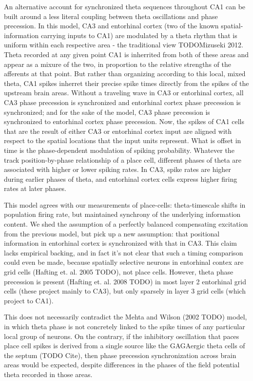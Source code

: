 \documentclass[10pt]{article}
\begin{document}
An alternative account for synchronized theta sequences throughout CA1 can be built around a less literal coupling between theta oscillations and phase precession. In this model, CA3 and entorhinal cortex (two of the known spatial-information carrying inputs to CA1) are modulated by a theta rhythm that is uniform within each respective area - the traditional view TODO{Mizuseki 2012}. Theta recorded at any given point CA1 is inherrited from both of these areas and appear as a mixure of the two, in proportion to the relative strengths of the afferents at that point. But rather than organizing according to this local, mixed theta, CA1 spikes inherret their precise spike times directly from the spikes of the upstream brain areas. Without a traveling wave in CA3 or entorhinal cortex, all CA3 phase precession is synchronized and entorhinal cortex phase precession is synchronized; and for the sake of the model, CA3 phase precession is synchronized to entorhinal cortex phase precession. Now, the spikes of CA1 cells that are the result of either CA3 or entorhinal cortex input are aligned with respect to the spatial locations that the input units represent. What is offset in time is the phase-dependent modulation of spiking probability. Whatever the track position-by-phase relationship of a place cell, different phases of theta are associated with higher or lower spiking rates. In CA3, spike rates are higher during earlier phases of theta, and entorhinal cortex cells express higher firing rates at later phases.

This model agrees with our measurements of place-cells: theta-timescale shifts in population firing rate, but maintained synchrony of the underlying information content. We shed the assumption of a perfectly balanced compensating excitation from the previous model, but pick up a new assumption: that positional information in entorhinal cortex is synchronized with that in CA3. This claim lacks empirical backing, and in fact it's not clear that such a timing comparison could even be made, because spatially selective neurons in entorhinal contex are grid cells (Hafting et. al. 2005 TODO), not place cells. However, theta phase precession is present (Hafting et. al. 2008 TODO) in most layer 2 entorhinal grid cells (these project mainly to CA3), but only sparsely in layer 3 grid cells (which project to CA1). 

This does not necessarily contradict the Mehta and Wilson (2002 TODO) model, in which theta phase is not concretely linked to the spike times of any particular local group of neurons. On the contrary, if the inhibitory oscillation that paces place cell spikes is derived from a single source like the GAGAergic theta cells of the septum (TODO Cite), then phase precession synchronization across brain areas would be expected, despite differences in the phases of the field potential theta recorded in those areas. 
\end{document}
